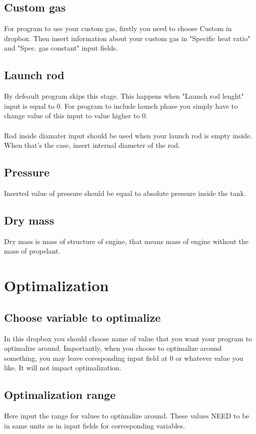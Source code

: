 \documentclass{report}
\begin{document}
\subsection*{Custom gas}
For program to use your custom gas, firstly you need to choose Custom in dropbox. Then insert information about your custom gas in "Specific heat ratio" and "Spec. gas constant" input fields.

\subsection*{Launch rod}
By defeault program skips this stage. This happens when "Launch rod lenght" input is equal to 0. For program to include launch phase you simply have to change value of this input to value higher to 0.  \\\\
Rod inside diamater input should be used when your launch rod is empty inside. When that's the case, insert internal diameter of the rod.

\subsection*{Pressure}
Inserted value of pressure should be equal to absolute pressure inside the tank.

\subsection*{Dry mass}
Dry mass is mass of structure of engine, that means mass of engine without the mass of propelant.

\section{Optimalization}

\subsection*{Choose variable to optimalize}
In this dropbox you should choose name of value that you want your program to optimalize around. Importantly, when you choose to optimalize around something, you may leave coresponding input field at 0 or whatever value you like. It will not impact optimalization.

\subsection*{Optimalization range}
Here input the range for values to optimalize around. These values NEED to be in same units as in input fields for corresponding variables.
\end{document}
